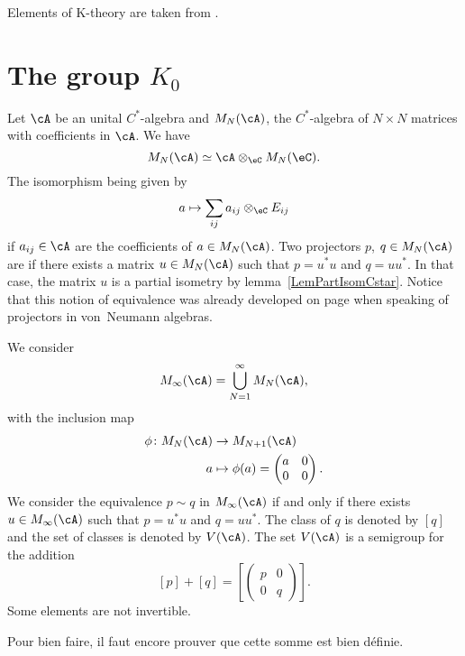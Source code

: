 Elements of K-theory are taken from \cite{VB_and_K,Landi}.

%
   \section{The group \texorpdfstring{$K_0$}{K0}}
%

Let $\cA$ be an unital $C^*$-algebra and $ M_N(\cA)$, the $C^*$-algebra of $N\times N$ matrices with coefficients in $\cA$. We have
\begin{equation}
 M_N(\cA)\simeq \cA\otimes_{\eC} M_N(\eC).
\end{equation}
The isomorphism being given by
\[
  a\mapsto \sum_{ij}a_{ij}\otimes_{\eC}E_{ij}
\]
if $a_{ij}\in\cA$ are the coefficients of $a\in M_N(\cA)$. Two projectors $p$, $q\in M_N(\cA)$ are  if there exists a matrix $u\in M_N(\cA)$ such that $p=u^*u$ and $q=uu^*$. In that case, the matrix $u$ is a partial isometry by lemma~\ref{LemPartIsomCstar}. Notice that this notion of equivalence was already developed on page \pageref{PgEaivVNMurray} when speaking of projectors in von~Neumann algebras.

We consider
\[
  M_{\infty}(\cA)=\bigcup_{N=1}^{\infty}M_N(\cA),
\]
with the inclusion map
\begin{equation}
\begin{aligned}
 \phi\colon M_N(\cA)&\to M_{N+1}(\cA) \\
a&\mapsto \phi(a)=
\begin{pmatrix}
a&0\\
0&0
\end{pmatrix}.
\end{aligned}
\end{equation}
We consider the equivalence $p\sim q$ in $M_{\infty}(\cA)$ if and only if there exists $u\in M_{\infty}(\cA)$ such that $p=u^*u$ and $q=uu^*$. The class of $q$ is denoted by $[q]$ and the set of classes is denoted by $V(\cA)$. The set $V(\cA)$ is a semigroup for the addition
\[
  [p]+[q]=
\left[
\begin{pmatrix}
p&0\\
0&q
\end{pmatrix}
\right].
\]
Some elements are not invertible.

\begin{probleme}
Pour bien faire, il faut encore prouver que cette somme est bien définie.
\end{probleme}


